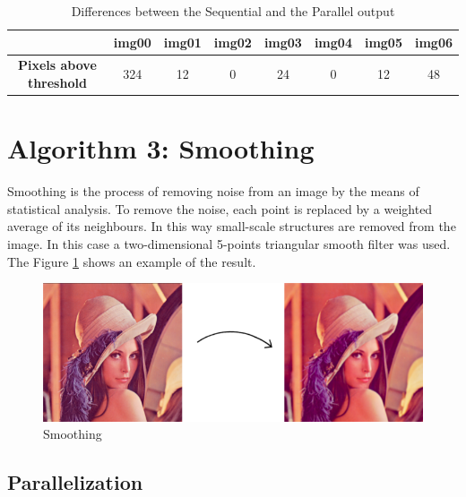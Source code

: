 \documentclass[a4paper]{article}
\begin{document}
\begin{table}[!ht]
\centering
\begin{tabular}{|c|l|c|c|l|l|l|l|}
\hline
\textbf{}                        & \textbf{img00}           & \textbf{img01} & \textbf{img02} & \textbf{img03}          & \textbf{img04}         & \textbf{img05}          & \textbf{img06}          \\ \hline
\textbf{Pixels above  threshold} & \multicolumn{1}{c|}{324} & 12             & 0              & \multicolumn{1}{c|}{24} & \multicolumn{1}{c|}{0} & \multicolumn{1}{c|}{12} & \multicolumn{1}{c|}{48} \\ \hline
\end{tabular}
\caption{Differences between the Sequential and the Parallel output}
\label{tab:pxabh}
\end{table}
\FloatBarrier
 

\section{Algorithm 3: Smoothing}
\label{sec:smoo}
Smoothing is the process of removing noise from an image by the means of statistical analysis. To remove the noise, each point is replaced by a weighted average of its neighbours. In this way small-scale structures are removed from the image. In this case a two-dimensional 5-points triangular smooth filter was used. The Figure \ref{fig:smooth} shows an example of the result.

\begin{figure}[!ht]
    \centering
    \includegraphics[width=0.5\linewidth]{smooth}
    \caption{Smoothing}
    \label{fig:smooth}
\end{figure}
\FloatBarrier


\subsection{Parallelization}
\label{sec:p3}
\end{document}
